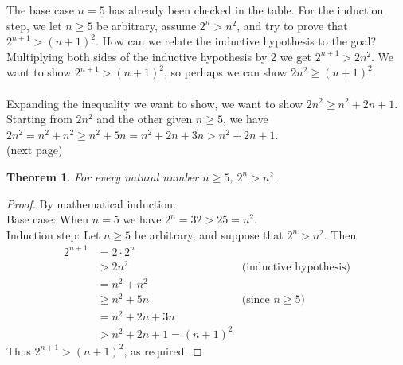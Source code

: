 \documentclass{report}
\newtheorem*{theorem}{Theorem}
\theoremstyle{definition}
\begin{document}
The base case $n=5$ has already been checked in the table. For the induction step, we let $n\geq 5$ be arbitrary, assume $2^n>n^2$, and try to prove that $2^{n+1}>(n+1)^2$. How can we relate the
inductive hypothesis to the goal? Multiplying both sides of the inductive hypothesis by 2 we get
$2^{n+1}>2n^2$. We want to show $2^{n+1}>(n+1)^2$, so perhaps we can show $2n^2\geq(n+1)^2$.\\
\vspace{1mm}\\
Expanding the inequality we want to show, we want to show $2n^2\geq n^2+2n+1$. Starting from $2n^2$ and the other given $n\geq 5$, we have $2n^2=n^2+n^2\geq n^2+5n=n^2+2n+3n>n^2+2n+1$.\\
(next page)\newpage
\begin{theorem}
For every natural number $n\geq5$, $2^n>n^2$.
\end{theorem}
\begin{proof}
By mathematical induction.\\
\indent Base case: When $n=5$ we have $2^n=32>25=n^2$.\\
\indent Induction step: Let $n\geq 5$ be arbitrary, and suppose that $2^n>n^2$. Then
\begin{align*}
2^{n+1}&=2\cdot2^n&\\
&>2n^2&\text{(inductive hypothesis)}\\
&=n^2+n^2&\\
&\geq n^2+5n&\text{(since $n\geq5$)}\\
&=n^2+2n+3n&\\
&>n^2+2n+1=(n+1)^2&
\end{align*}
Thus $2^{n+1}>(n+1)^2$, as required.
\end{proof}
\newpage
\end{document}
